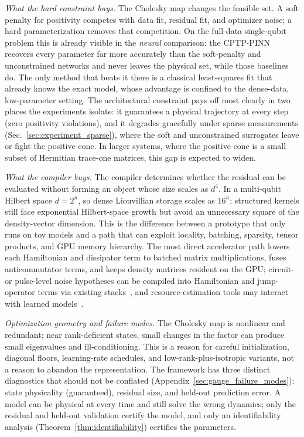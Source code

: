 \documentclass[twocolumn,aps,prxquantum,superscriptaddress,nofootinbib,floatfix,longbibliography]{revtex4-2}
\begin{document}
\emph{What the hard constraint buys.} The Cholesky map changes the feasible set. A soft penalty for positivity competes with data fit, residual fit, and optimizer noise; a hard parameterization removes that competition. On the full-data single-qubit problem this is already visible in the \emph{neural} comparison: the CPTP-PINN recovers every parameter far more accurately than the soft-penalty and unconstrained networks and never leaves the physical set, while those baselines do. The only method that beats it there is a classical least-squares fit that already knows the exact model, whose advantage is confined to the dense-data, low-parameter setting. The architectural constraint pays off most clearly in two places the experiments isolate: it guarantees a physical trajectory at every step (zero positivity violations), and it degrades gracefully under sparse measurements (Sec.~\ref{sec:experiment_sparse}), where the soft and unconstrained surrogates leave or fight the positive cone. In larger systems, where the positive cone is a small subset of Hermitian trace-one matrices, this gap is expected to widen.

\emph{What the compiler buys.} The compiler determines whether the residual can be evaluated without forming an object whose size scales as $d^4$. In a multi-qubit Hilbert space $d=2^n$, so dense Liouvillian storage scales as $16^n$; structured kernels still face exponential Hilbert-space growth but avoid an unnecessary square of the density-vector dimension. This is the difference between a prototype that only runs on toy models and a path that can exploit locality, batching, sparsity, tensor products, and GPU memory hierarchy. The most direct accelerator path lowers each Hamiltonian and dissipator term to batched matrix multiplications, fuses anticommutator terms, and keeps density matrices resident on the GPU; circuit- or pulse-level noise hypotheses can be compiled into Hamiltonian and jump-operator terms via existing stacks~\cite{qiskit2024,qutip2024}, and resource-estimation tools may interact with learned models~\cite{beverland2022assessing,rall2023quantum}.

\emph{Optimization geometry and failure modes.} The Cholesky map is nonlinear and redundant; near rank-deficient states, small changes in the factor can produce small eigenvalues and ill-conditioning. This is a reason for careful initialization, diagonal floors, learning-rate schedules, and low-rank-plus-isotropic variants, not a reason to abandon the representation. The framework has three distinct diagnostics that should not be conflated (Appendix~\ref{sec:gauge_failure_modes}): state physicality (guaranteed), residual size, and held-out prediction error. A model can be physical at every time and still solve the wrong dynamics; only the residual and held-out validation certify the model, and only an identifiability analysis (Theorem~\ref{thm:identifiability}) certifies the parameters.
\end{document}
